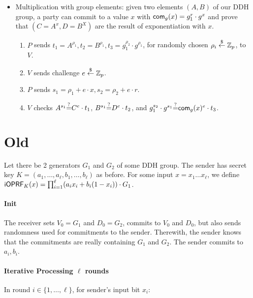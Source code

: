 \documentclass{article}
\begin{document}
\begin{itemize}
  \item Multiplication with group elements: given two elements $(A,B)$
    of our DDH group, a party can commit to a value $x$ with
    $\mathsf{com}_g(x) =g_1^r\cdot{}g^x$ and prove that $(C=A^x,D=B^X)$ are the
    result of exponentiation with $x$.
    \begin{enumerate}
      \item $P$ sends $t_1=A^{\rho_1},t_2=B^{\rho_1},
        t_3=g_1^{\rho_2}\cdot{}g^{\rho_1}$, for randomly chosen
        $\rho_i\stackrel{\$}{\leftarrow}\mathbb{Z}_p$, to $V$.

      \item $V$ sends challenge $e\stackrel{\$}{\leftarrow}\mathbb{Z}_p$.

      \item $P$ sends $s_1=\rho_1+e\cdot{}x,s_2=\rho_2+e\cdot{}r$.
        \item $V$ checks $A^{s_1}{\stackrel{?}{=}}{}C^e\cdot{}t_1$,
          $B^{s_1}{\stackrel{?}{=}}{}D^e\cdot{}t_2$, and
          $g_1^{s_2}\cdot{}g^{s_1}{\stackrel{?}{=}}{}\mathsf{com}_g(x)^e\cdot{}t_3$.
      \end{enumerate}
\end{itemize}

\newpage
\section{Old}
Let there be 2 generators $G_1$ and $G_2$ of some DDH group. The
sender has secret key $K=(a_1,\ldots,a_\ell,b_1,\ldots,b_\ell)$ as
before. For some input $x=x_1\ldots{}x_\ell$, we define
$\mathsf{i}\mathsf{OPRF}_K(x)=\prod_{i=1}^{\ell}(a_ix_i+b_i(1-x_i))\cdot{}G_1$.

\paragraph{Init}
The receiver sets $V_0 = G_1$ and $D_0 = G_2$, commits to $V_0$ and
$D_0$, but also sends randomness used for commitments to the
sender. Therewith, the sender knows that the commitments are really
containing $G_1$ and $G_2$. The sender commits to $a_i,b_i$.

\paragraph{Iterative Processing $\ell$ rounds}
In round $i\in\{1,\ldots,\ell\}$, for sender's input bit $x_i$:
\end{document}
